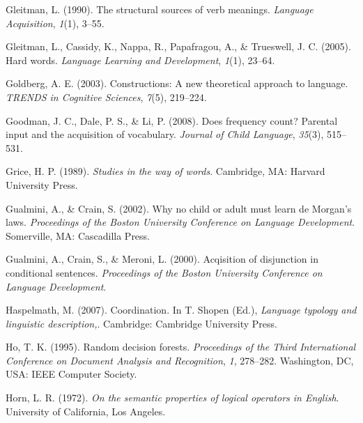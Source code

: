 \documentclass[
  ,man,floatsintext]{apa6}
\newlength{\cslhangindent}
\newlength{\cslentryspacingunit} %
\newenvironment{CSLReferences}[2] %
 {%
  \setlength{\parindent}{0pt}
  \ifodd #1
  \let\oldpar\par
  \def\par{\hangindent=\cslhangindent\oldpar}
  \fi
  \setlength{\parskip}{#2\cslentryspacingunit}
 }%
 {}
\begin{document}
\begin{CSLReferences}{1}{0}
\leavevmode{}%
Gleitman, L. (1990). The structural sources of verb meanings. \emph{Language Acquisition}, \emph{1}(1), 3--55.

\leavevmode{}%
Gleitman, L., Cassidy, K., Nappa, R., Papafragou, A., \& Trueswell, J. C. (2005). Hard words. \emph{Language Learning and Development}, \emph{1}(1), 23--64.

\leavevmode{}%
Goldberg, A. E. (2003). Constructions: A new theoretical approach to language. \emph{{TRENDS} in {C}ognitive {S}ciences}, \emph{7}(5), 219--224.

\leavevmode{}%
Goodman, J. C., Dale, P. S., \& Li, P. (2008). Does frequency count? Parental input and the acquisition of vocabulary. \emph{Journal of Child Language}, \emph{35}(3), 515--531.

\leavevmode{}%
Grice, H. P. (1989). \emph{Studies in the way of words}. Cambridge, MA: Harvard University Press.

\leavevmode{}%
Gualmini, A., \& Crain, S. (2002). Why no child or adult must learn de {M}organ's laws. \emph{Proceedings of the {B}oston {U}niversity Conference on Language Development}. Somerville, MA: Cascadilla Press.

\leavevmode{}%
Gualmini, A., Crain, S., \& Meroni, L. (2000). Acqisition of disjunction in conditional sentences. \emph{Proceedings of the Boston University Conference on Language Development}.

\leavevmode{}%
Haspelmath, M. (2007). Coordination. In T. Shopen (Ed.), \emph{Language typology and linguistic description,}. Cambridge: Cambridge University Press.

\leavevmode{}%
Ho, T. K. (1995). Random decision forests. \emph{Proceedings of the Third International Conference on Document Analysis and Recognition}, \emph{1}, 278--282. Washington, DC, USA: {IEEE} Computer Society.

\leavevmode{}%
Horn, L. R. (1972). \emph{On the semantic properties of logical operators in {E}nglish}. University of California, Los Angeles.


\end{CSLReferences}
\end{document}
